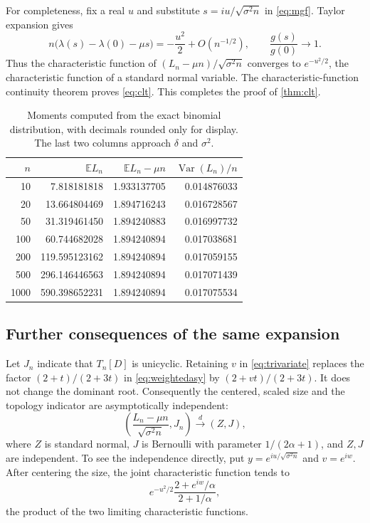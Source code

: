\documentclass[11pt,letterpaper]{article}
\numberwithin{equation}{section}
\theoremstyle{definition}
\newcommand{\E}{\mathbb E}
\newcommand{\Var}{\operatorname{Var}}
\newcommand{\1}{\mathbf 1}
\begin{document}
For completeness, fix a real $u$ and substitute
$s=iu/\sqrt{\sigma^2n}$ in \eqref{eq:mgf}. Taylor expansion gives
\[
 n\bigl(\lambda(s)-\lambda(0)-\mu s\bigr)
 =-\frac{u^2}{2}+O(n^{-1/2}),\qquad
 \frac{g(s)}{g(0)}\longrightarrow1.
\]
Thus the characteristic function of
$(L_n-\mu n)/\sqrt{\sigma^2n}$ converges to $e^{-u^2/2}$, the characteristic
function of a standard normal variable. The characteristic-function continuity
theorem proves \eqref{eq:clt}. This completes the proof of \cref{thm:clt}.

\begin{table}[ht]
\centering
\begin{tabular}{rrrr}
\toprule
$n$ & $\E L_n$ & $\E L_n-\mu n$ & $\Var(L_n)/n$\\
\midrule
10 & 7.818181818 & 1.933137705 & 0.014876033\\
20 & 13.664804469 & 1.894716243 & 0.016728567\\
50 & 31.319461450 & 1.894240883 & 0.016997732\\
100 & 60.744682028 & 1.894240894 & 0.017038681\\
200 & 119.595123162 & 1.894240894 & 0.017059155\\
500 & 296.146446563 & 1.894240894 & 0.017071439\\
1000 & 590.398652231 & 1.894240894 & 0.017075534\\
\bottomrule
\end{tabular}
\caption{Moments computed from the exact binomial distribution, with decimals
rounded only for display. The last two columns approach $\delta$ and $\sigma^2$.}
\end{table}

\subsection{Further consequences of the same expansion}
Let $J_n$ indicate that $T_n[D]$ is unicyclic. Retaining $v$ in
\eqref{eq:trivariate} replaces the factor $(2+t)/(2+3t)$ in
\eqref{eq:weightedasy} by $(2+vt)/(2+3t)$. It does not change the dominant root.
Consequently the centered, scaled size and the topology indicator are
asymptotically independent:
\begin{equation}\label{eq:jointlimit}
 \left(\frac{L_n-\mu n}{\sqrt{\sigma^2n}},J_n\right)
 \xrightarrow{\ d\ }(Z,J),
\end{equation}
where $Z$ is standard normal, $J$ is Bernoulli with parameter
$1/(2\alpha+1)$, and $Z,J$ are independent. To see the independence directly,
put $y=e^{iu/\sqrt{\sigma^2n}}$ and $v=e^{iw}$. After centering the size, the
joint characteristic function tends to
\[
 e^{-u^2/2}\frac{2+e^{iw}/\alpha}{2+1/\alpha},
\]
the product of the two limiting characteristic functions.
\end{document}
